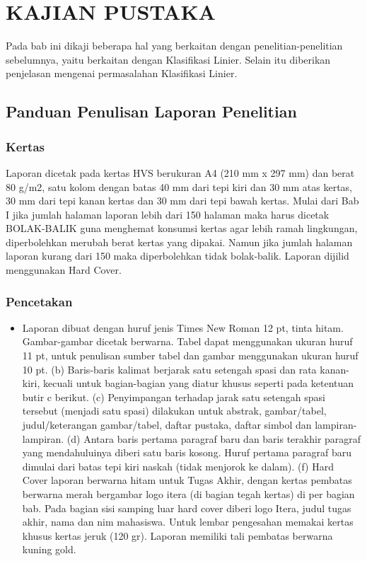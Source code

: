 \pagestyle{fancy}
\fancyhead[R]{}
\fancyfoot[C]{\thepage}
\chapter{KAJIAN PUSTAKA}\label{bab2}

Pada bab ini dikaji beberapa hal yang berkaitan dengan penelitian-penelitian sebelumnya, yaitu berkaitan dengan Klasifikasi Linier. Selain itu diberikan penjelasan mengenai permasalahan Klasifikasi Linier.
\section{Panduan Penulisan Laporan Penelitian}

\subsection{Kertas}
Laporan dicetak pada kertas HVS berukuran A4 (210 mm x 297 mm) dan berat 80 g/m2, satu kolom dengan batas 40 mm dari tepi kiri dan 30 mm atas kertas, 30 mm dari tepi kanan kertas dan 30 mm dari tepi bawah kertas. Mulai dari Bab I jika jumlah halaman laporan lebih dari 150 halaman maka harus dicetak BOLAK-BALIK guna menghemat konsumsi kertas agar lebih ramah lingkungan, diperbolehkan merubah berat kertas yang dipakai. Namun jika jumlah halaman laporan kurang dari 150 maka diperbolehkan tidak bolak-balik. Laporan dijilid menggunakan Hard Cover.

\subsection{Pencetakan}
\begin{itemize}
	\item
	Laporan dibuat dengan huruf jenis Times New Roman 12 pt, tinta hitam. Gambar-gambar dicetak berwarna. Tabel dapat menggunakan ukuran huruf 11 pt, untuk penulisan sumber tabel dan gambar menggunakan ukuran huruf 10 pt. 
	(b) Baris-baris kalimat berjarak satu setengah spasi dan rata kanan-kiri, kecuali untuk bagian-bagian yang diatur khusus seperti pada ketentuan butir c berikut. 
	(c) Penyimpangan terhadap jarak satu setengah spasi tersebut (menjadi satu spasi) dilakukan untuk abstrak, gambar/tabel, judul/keterangan gambar/tabel, daftar pustaka, daftar simbol dan lampiran-lampiran. 
	(d) Antara baris pertama paragraf baru dan baris terakhir paragraf yang mendahuluinya diberi satu baris kosong. Huruf pertama paragraf baru dimulai dari batas tepi kiri naskah (tidak menjorok ke dalam). 
	(f) Hard Cover laporan berwarna hitam untuk Tugas Akhir, dengan kertas pembatas berwarna merah  bergambar logo itera (di bagian tegah kertas) di per bagian bab. Pada bagian sisi samping luar hard cover diberi logo Itera, judul tugas akhir, nama dan nim mahasiswa. Untuk lembar pengesahan memakai kertas khusus kertas jeruk (120 gr). Laporan memiliki tali pembatas berwarna kuning gold. 
\end{itemize}

